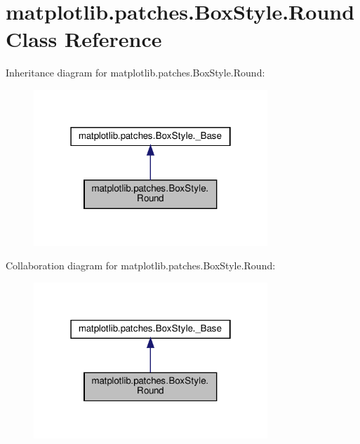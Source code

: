 \hypertarget{classmatplotlib_1_1patches_1_1BoxStyle_1_1Round}{}\section{matplotlib.\+patches.\+Box\+Style.\+Round Class Reference}
\label{classmatplotlib_1_1patches_1_1BoxStyle_1_1Round}


Inheritance diagram for matplotlib.\+patches.\+Box\+Style.\+Round\+:
\nopagebreak
\begin{figure}[H]
\begin{center}
\leavevmode
\includegraphics[width=250pt]{classmatplotlib_1_1patches_1_1BoxStyle_1_1Round__inherit__graph}
\end{center}
\end{figure}


Collaboration diagram for matplotlib.\+patches.\+Box\+Style.\+Round\+:
\nopagebreak
\begin{figure}[H]
\begin{center}
\leavevmode
\includegraphics[width=250pt]{classmatplotlib_1_1patches_1_1BoxStyle_1_1Round__coll__graph}
\end{center}
\end{figure}
